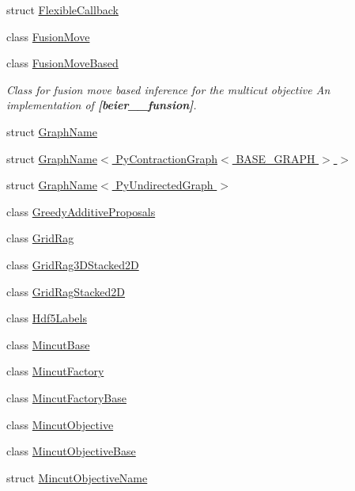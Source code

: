 \begin{DoxyCompactItemize}
\item 
struct \hyperlink{structnifty_1_1graph_1_1FlexibleCallback}{Flexible\+Callback}
\item 
class \hyperlink{classnifty_1_1graph_1_1FusionMove}{Fusion\+Move}
\item 
class \hyperlink{classnifty_1_1graph_1_1FusionMoveBased}{Fusion\+Move\+Based}
\begin{DoxyCompactList}\small\item\em Class for fusion move based inference for the multicut objective An implementation of {\bfseries [beier\+\_\+\_\+funsion]}. \end{DoxyCompactList}\item 
struct \hyperlink{structnifty_1_1graph_1_1GraphName}{Graph\+Name}
\item 
struct \hyperlink{structnifty_1_1graph_1_1GraphName_3_01PyContractionGraph_3_01BASE__GRAPH_01_4_01_4}{Graph\+Name$<$ Py\+Contraction\+Graph$<$ B\+A\+S\+E\+\_\+\+G\+R\+A\+P\+H $>$ $>$}
\item 
struct \hyperlink{structnifty_1_1graph_1_1GraphName_3_01PyUndirectedGraph_01_4}{Graph\+Name$<$ Py\+Undirected\+Graph $>$}
\item 
class \hyperlink{classnifty_1_1graph_1_1GreedyAdditiveProposals}{Greedy\+Additive\+Proposals}
\item 
class \hyperlink{classnifty_1_1graph_1_1GridRag}{Grid\+Rag}
\item 
class \hyperlink{classnifty_1_1graph_1_1GridRag3DStacked2D}{Grid\+Rag3\+D\+Stacked2\+D}
\item 
class \hyperlink{classnifty_1_1graph_1_1GridRagStacked2D}{Grid\+Rag\+Stacked2\+D}
\item 
class \hyperlink{classnifty_1_1graph_1_1Hdf5Labels}{Hdf5\+Labels}
\item 
class \hyperlink{classnifty_1_1graph_1_1MincutBase}{Mincut\+Base}
\item 
class \hyperlink{classnifty_1_1graph_1_1MincutFactory}{Mincut\+Factory}
\item 
class \hyperlink{classnifty_1_1graph_1_1MincutFactoryBase}{Mincut\+Factory\+Base}
\item 
class \hyperlink{classnifty_1_1graph_1_1MincutObjective}{Mincut\+Objective}
\item 
class \hyperlink{classnifty_1_1graph_1_1MincutObjectiveBase}{Mincut\+Objective\+Base}
\item 
struct \hyperlink{structnifty_1_1graph_1_1MincutObjectiveName}{Mincut\+Objective\+Name}
\item 

\end{DoxyCompactItemize}
